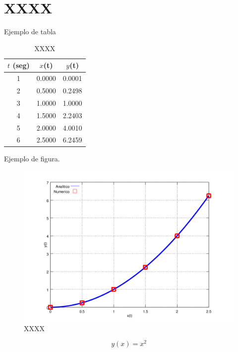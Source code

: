 \section{XXXX}

Ejemplo de tabla

\begin{table}[h!]
\centering
\caption{XXXX}
\label{tab:comp}
\begin{tabular}{|c|c|c|}
  \hline
  $t$ (seg) & $x$(t) & $y$(t)\\
  \hline
  1 & 0.0000 & 0.0001\\
  2 & 0.5000 & 0.2498\\
  3 & 1.0000 & 1.0000\\
  4 & 1.5000 & 2.2403\\
  5 & 2.0000 & 4.0010\\
  6 & 2.5000 & 6.2459\\
  \hline
\end{tabular}
\end{table}

Ejemplo de figura.

\begin{figure}[h!]
\caption{XXXX}
\label{fig:comp}
\includegraphics[width=.8\textwidth]{imagenes/chap4/x_vs_y}
\end{figure}

\begin{equation}
y(x)=x^2
\end{equation}
